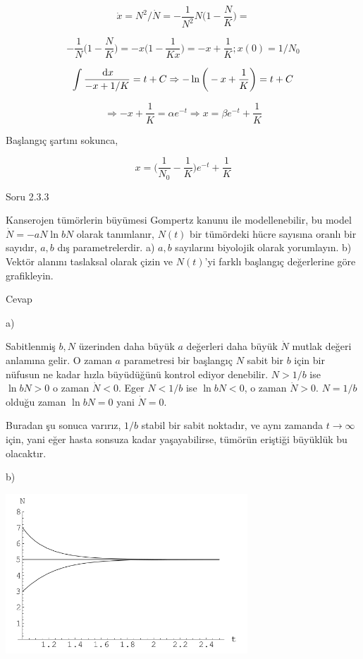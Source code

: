 \documentclass[12pt,fleqn]{article}\usepackage{../../common}
\begin{document}
$$ \dot{x} = N^2/\dot{N} = -\frac{1}{N^2}N\bigg( 1 - \frac{N}{K} \bigg) = $$

$$
-\frac{1}{N} \bigg( 1 - \frac{N}{K} \bigg) = -x \bigg( 1 - \frac{1}{Kx}\bigg) =
-x + \frac{1}{K}; x(0) = 1/N_0
$$

$$
\int \frac{\,\mathrm{d} x}{-x + 1/K} = t + C \Rightarrow
-\ln \bigg( -x + \frac{1}{K}\bigg) = t + C
$$ 

$$
\Rightarrow -x + \frac{1}{K} = \alpha e^{-t} \Rightarrow
x = \beta e^{-t} +\frac{1}{K}
$$

Başlangıç şartını sokunca,

$$
x = \bigg( \frac{1}{N_0} - \frac{1}{K} \bigg) e^{-t} + \frac{1}{K}
$$

Soru 2.3.3

Kanserojen tümörlerin büyümesi Gompertz kanunu ile modellenebilir, bu model
$\dot{N} = -a N \ln bN$ olarak tanımlanır, $N(t)$ bir tümördeki hücre sayısına
oranlı bir sayıdır, $a,b$ dış parametrelerdir. a) $a,b$ sayılarını biyolojik
olarak yorumlayın. b) Vektör alanını taslaksal olarak çizin ve $N(t)$'yi farklı
başlangıç değerlerine göre grafikleyin.

Cevap

a)

Sabitlenmiş $b,N$ üzerinden daha büyük $a$ değerleri daha büyük $\dot{N}$ mutlak
değeri anlamına gelir. O zaman $a$ parametresi bir başlangıç $N$ sabit bir $b$
için bir nüfusun ne kadar hızla büyüdüğünü kontrol ediyor denebilir. $N > 1/b$
ise $\ln bN>0$ o zaman $\dot{N} < 0$. Eger $N<1/b$ ise $\ln bN < 0$, o zaman
$\dot{N}>0$. $N=1/b$ olduğu zaman $\ln bN = 0$ yani $\dot{N}=0$.

Buradan şu sonuca varırız, $1/b$ stabil bir sabit noktadır, ve aynı zamanda
$t \to \infty$ için, yani eğer hasta sonsuza kadar yaşayabilirse, tümörün
eriştiği büyüklük bu olacaktır.

b)

\includegraphics[height=6cm]{03_14.png}
\end{document}
